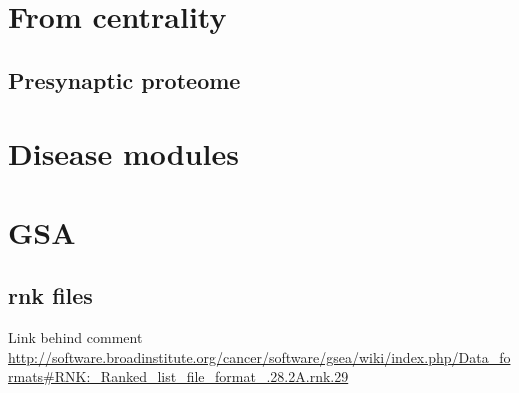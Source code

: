   


\section{From centrality}
\subsection{Presynaptic proteome}



\section{Disease modules}
\section{GSA}
\subsection{rnk files}
Link behind comment \url{http://software.broadinstitute.org/cancer/software/gsea/wiki/index.php/Data_formats#RNK:_Ranked_list_file_format_.28.2A.rnk.29}
\clearpage{}



